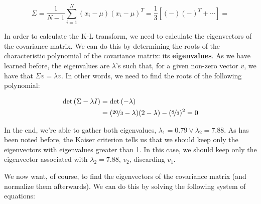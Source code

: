 \documentclass[12pt]{article}
\begin{document}
\begin{enumerate}[leftmargin=\labelsep]
  \begin{equation*}
    \Sigma = \frac{1}{N - 1} \sum_{i=1}^N \left(x_i - \mu\right) \left(x_i - \mu\right)^T
    = \frac{1}{3} \left[\left(
       -  \right)
      \left( - \right)^T
      + \cdots \right]
    = 
  \end{equation*}

  In order to calculate the K-L transform, we need to calculate the eigenvectors of
  the covariance matrix. We can do this by determining the roots of the characteristic
  polynomial of the covariance matrix: its \textbf{eigenvalues}. As we have
  learned before, the eigenvalues are $\lambda$'s such that, for a given non-zero
  vector $v$, we have that $\Sigma v = \lambda v$. In other words, we need to find
  the roots of the following polynomial:

  \begin{equation*}
    \begin{aligned}
      \det\left(\Sigma - \lambda I\right) & = \det\left(
       - \lambda 
      \right)                                                                                                     \\
                                          & = (\nicefrac{20}{3} - \lambda)(2 - \lambda) - (\nicefrac{8}{3})^2 = 0
    \end{aligned}
  \end{equation*}

  In the end, we're able to gather both eigenvalues, $\lambda_1 = 0.79 \vee \lambda_2 = 7.88$.
  As has been noted before, the Kaiser criterion tells us that we should keep only
  the eigenvectors with eigenvalues greater than 1. In this case, we should keep
  only the eigenvector associated with $\lambda_2 = 7.88$, $v_2$, discarding $v_1$.


  We now want, of course, to find the eigenvectors of the covariance matrix (and
  normalize them afterwards). We can do this by solving the following system of
  equations:


\end{enumerate}
\end{document}
